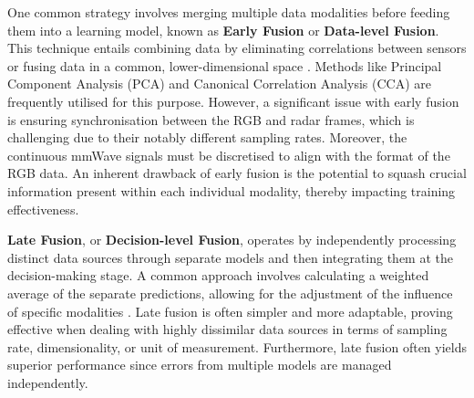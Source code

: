 \documentclass{mpaper}
\begin{document}
One common strategy involves merging multiple data modalities before feeding them into a learning model, known as \textbf{Early Fusion} or \textbf{Data-level Fusion}. This technique entails combining data by eliminating correlations between sensors or fusing data in a common, lower-dimensional space \cite{khaleghi2013multisensor}. Methods like Principal Component Analysis (PCA) and Canonical Correlation Analysis (CCA) are frequently utilised for this purpose. However, a significant issue with early fusion is ensuring synchronisation between the RGB and radar frames, which is challenging due to their notably different sampling rates. Moreover, the continuous mmWave signals must be discretised to align with the format of the RGB data. An inherent drawback of early fusion is the potential to squash crucial information present within each individual modality, thereby impacting training effectiveness.

\textbf{Late Fusion}, or \textbf{Decision-level Fusion}, operates by independently processing distinct data sources through separate models and then integrating them at the decision-making stage. A common approach involves calculating a weighted average of the separate predictions, allowing for the adjustment of the influence of specific modalities \cite{pawlowski2023effective}. Late fusion is often simpler and more adaptable, proving effective when dealing with highly dissimilar data sources in terms of sampling rate, dimensionality, or unit of measurement. Furthermore, late fusion often yields superior performance since errors from multiple models are managed independently.
\end{document}
